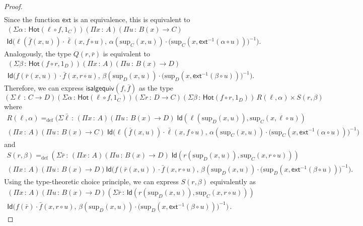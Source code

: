 \documentclass[10pt,a4paper,oneside,reqno]{amsart}
\numberwithin{equation}{section}
\theoremstyle{mythm}
\theoremstyle{mydef}
\theoremstyle{myrmk}
\newcommand{\defeq}{=_{\mathrm{def}}}
\newcommand{\co}{\,{:}\,}
\newcommand{\com}{\circ}
\newcommand{\ct}{\cdot}
\newcommand{\Hot}{\mathsf{Hot}}
\newcommand{\ext}{\mathsf{ext}}
\newcommand{\Id}{\mathsf{Id}}
\renewcommand{\sup}{\mathrm{sup}}
\begin{document}
\begin{proof}
\begin{multline*}
\end{multline*}
Since the function $\ext$ is an equivalence, this is equivalent to
\begin{multline*}
(\Sigma \alpha \co \Hot( \ell \circ f, 1{_C}))
(\Pi x \co A) 
(\Pi u \co B(x) \to C) \\
	\Id\Big(\ell(\bar{f}(x,u)) \ct \bar{\ell}(x, f \com u),\, \alpha(\sup_C(x,u)) \ct \big(\sup_C(x, \ext^{-1}(\alpha \circ u))\big)^{-1}\Big).
\end{multline*}
Analogously, the type $Q(r,\bar{r})$ is equivalent to
\begin{multline*}
(\Sigma \beta \co \Hot( f \com r , 1_D))
(\Pi x \co A) 
(\Pi u \co B(x) \to D) \\ 
\Id \Big(f(\bar{r}(x,u)) \ct \bar{f}(x, r \com u),\, \beta(\sup_D(x,u)) \ct \big(\sup_D(x,\ext^{-1}(\beta \circ u))\big)^{-1}\Big).
\end{multline*}
Therefore, we can express $\mathsf{isalgequiv}(f,\bar{f})$ as the type
\[ 
(\Sigma \ell \co C\to D) 
(\Sigma \alpha \co \Hot(\ell \circ f, 1_C))
(\Sigma r \co D\to C) 
(\Sigma \beta \co \Hot(f \circ r , 1_D)) \, 
	R(\ell,\alpha) \times S(r,\beta)
	\]
where
\begin{multline*}
R(\ell,\alpha) \defeq 
(\Sigma \bar{\ell} \co 
(\Pi x \co A) 
(\Pi u \co B(x) \to D) \;
\Id(\ell(\sup_D(x,u)), \sup_C(x,\ell \circ u)) \\
(\Pi x \co A) 
(\Pi u \co B(x) \to C) \;
		 \Id\Big(\ell(\bar{f}(x,u)) \ct \bar{\ell}(x, f \com u),\, \alpha(\sup_C(x,u)) \ct \big(\sup_C(x,\ext^{-1}(\alpha \circ u))\big)^{-1}\Big) 
		\end{multline*}
		and
\begin{multline*}
S(r,\beta) \defeq 
(\Sigma \bar{r} \co (\Pi x \co A) (\Pi u \co B(x) \to D) \; \Id(r(\sup_D(x,u)), \sup_C(x,r\circ u))) \\
	 (\Pi x \co A) (\Pi u \co B(x) \to D) 
	 		\Id\Big(f(\bar{r}(x,u)) \ct \bar{f}(x, r \com u),\, \beta(\sup_D(x,u)) \ct \big(\sup_D(x,\ext^{-1}(\beta \circ u))\big)^{-1}\Big).
\end{multline*}
Using the type-theoretic choice principle, we can express $S(r,\beta)$ equivalently as
\begin{multline*}
(\Pi x \co A) 
(\Pi u \co B(x) \to D) 
(\Sigma \bar{r} \co \Id(r(\sup_D(x,u)), \sup_C(x,r \circ u)))  \\ 
\Id\Big(f(\bar{r}) \ct \bar{f}(x, r \com u) ,\, \beta(\sup_D(x,u)) \ct \big(\sup_D(x,\ext^{-1}(\beta \circ u))\big)^{-1}\Big) \, .
\end{multline*} 

\end{proof}
\end{document}

